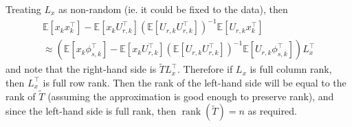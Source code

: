 \documentclass[11pt]{report} %
\begin{document}
Treating $L_{x}$ as non-random (ie. it could be fixed to the data), then
\begin{multline}
\mathbb{E}\left[x_{k}x_{k}^{\top}\right] - \mathbb{E}\left[x_{k}U_{r,k}^{\top}\right]\left(\mathbb{E}\left[U_{r,k}U_{r,k}^{\top}\right]\right)^{-1}\mathbb{E}\left[U_{r,k}x_{k}^{\top}\right] \\
\approx \left(\mathbb{E}\left[x_{k}\phi_{s, k}^{\top}\right] - \mathbb{E}\left[x_{k}U_{r, k}^{\top}\right]\left(\mathbb{E}\left[U_{r, k}U_{r, k}^{\top}\right]\right)^{-1}\mathbb{E}\left[U_{r, k}\phi_{s, k}^{\top}\right]\right)L_{x}^{\top}
\end{multline}
and note that the right-hand side is $\widetilde{T}L_{x}^{\top}$. Therefore if $L_{x}$ is full column rank, then $L_{x}^{\top}$ is full row rank. Then the rank of the left-hand side will be equal to the rank of $\widetilde{T}$ (assuming the approximation is good enough to preserve rank), and since the left-hand side is full rank, then $\operatorname{rank}\left(\widetilde{T}\right) = n$ as required. \\
\end{document}
